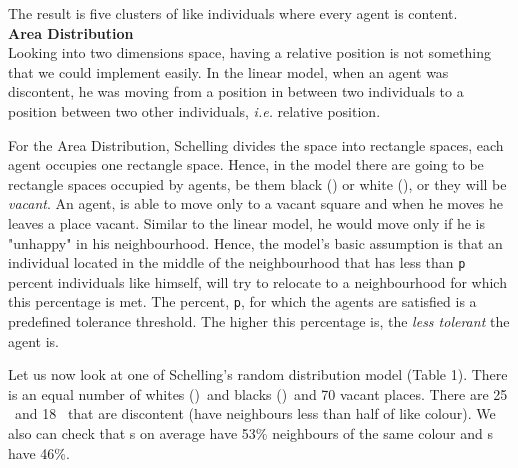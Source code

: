 \documentclass[../main.tex]{subfiles}
\begin{document}
The result is five clusters of like individuals where every agent is content.\\

\textbf{Area Distribution}\\
Looking into two dimensions space, having a relative position is not something that we could implement easily. In the linear model, when an agent was discontent, he was moving from a position in between two individuals to a position between two other individuals, \textit{i.e.} relative position. 

For the Area Distribution, Schelling divides the space into rectangle spaces, each agent occupies one rectangle space. Hence, in the model there are going to be rectangle spaces occupied by agents, be them black (\x) or white (\z), or they will be \textit{vacant}. An agent, is able to move only to a vacant square and when he moves he leaves a place vacant. Similar to the linear model, he would move only if he is "unhappy" in his neighbourhood. Hence, the model's basic assumption is that an individual located in the middle of the neighbourhood that has less than \verb|p| percent individuals like himself, will try to relocate to a neighbourhood for which this percentage is met. The percent, \verb|p|, for which the agents are satisfied is a predefined tolerance threshold. The higher this percentage is, the \textit{less tolerant} the agent is.

Let us now look at one of Schelling's random distribution model (Table 1). There is an equal number of whites (\z)\ and blacks (\x)\ and 70 vacant places. There are 25 \x\ and 18 \z\ that are discontent (have neighbours less than half of like colour). We also can check that \z s on average have 53\% neighbours of the same colour and \x s have 46\%.
\end{document}
